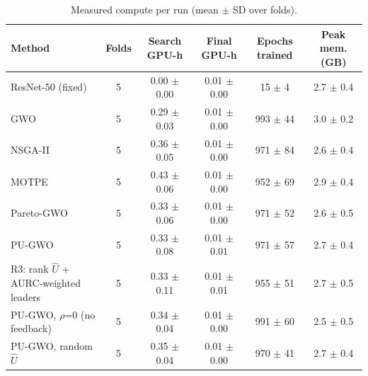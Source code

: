 \begin{table}[t]
\centering
\caption{Measured compute per run (mean $\pm$ SD over folds).}
\label{tab:table9_compute_cost}
\small
\begin{tabular}{lccccc}
\toprule
Method & Folds & Search GPU-h & Final GPU-h & Epochs trained & Peak mem. (GB) \\
\midrule
ResNet-50 (fixed) & 5 & 0.00 $\pm$ 0.00 & 0.01 $\pm$ 0.00 & 15 $\pm$ 4 & 2.7 $\pm$ 0.4 \\
GWO & 5 & 0.29 $\pm$ 0.03 & 0.01 $\pm$ 0.00 & 993 $\pm$ 44 & 3.0 $\pm$ 0.2 \\
NSGA-II & 5 & 0.36 $\pm$ 0.05 & 0.01 $\pm$ 0.00 & 971 $\pm$ 84 & 2.6 $\pm$ 0.4 \\
MOTPE & 5 & 0.43 $\pm$ 0.06 & 0.01 $\pm$ 0.00 & 952 $\pm$ 69 & 2.9 $\pm$ 0.4 \\
Pareto-GWO & 5 & 0.33 $\pm$ 0.06 & 0.01 $\pm$ 0.00 & 971 $\pm$ 52 & 2.6 $\pm$ 0.5 \\
PU-GWO & 5 & 0.33 $\pm$ 0.08 & 0.01 $\pm$ 0.01 & 971 $\pm$ 57 & 2.7 $\pm$ 0.4 \\
R3: rank $\hat{U}$ + AURC-weighted leaders & 5 & 0.33 $\pm$ 0.11 & 0.01 $\pm$ 0.01 & 955 $\pm$ 51 & 2.7 $\pm$ 0.5 \\
PU-GWO, $\rho$=0 (no feedback) & 5 & 0.34 $\pm$ 0.04 & 0.01 $\pm$ 0.00 & 991 $\pm$ 60 & 2.5 $\pm$ 0.5 \\
PU-GWO, random $\hat{U}$ & 5 & 0.35 $\pm$ 0.04 & 0.01 $\pm$ 0.00 & 970 $\pm$ 41 & 2.7 $\pm$ 0.4 \\
\bottomrule
\end{tabular}
\end{table}
